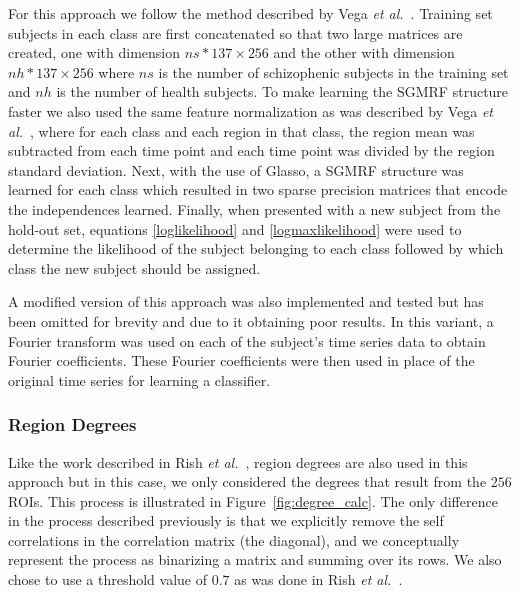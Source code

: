 \documentclass{article} %
\begin{document}
For this approach we follow the method described by Vega \emph{et al.}~\cite{rvega}.
Training set subjects in each class are first concatenated so that two large 
matrices are created, one with dimension $ns * 137 \times 256$ and the other 
with dimension $nh * 137 \times 256$ where $ns$ is the number of schizophenic 
subjects in the training set and $nh$ is the number of health subjects. To
make learning the SGMRF structure faster we also used the same feature 
normalization as was described by Vega \emph{et al.}~\cite{rvega},
where for each class and each region in that class, the region mean was 
subtracted from each time point and each time point was divided by the 
region standard deviation. Next, with the use of Glasso, a SGMRF structure was 
learned for each class which resulted in two sparse precision matrices that 
encode the independences learned. Finally, when presented with a new subject 
from the hold-out set, equations \eqref{loglikelihood} and 
\eqref{logmaxlikelihood} were used to determine the likelihood of the subject 
belonging to each class followed by which class the new subject should be 
assigned.

A modified version of this approach was also implemented and tested but has
been omitted for brevity and due to it obtaining poor results. In this variant,
a Fourier transform was used on each of the subject's time series data to 
obtain Fourier coefficients. These Fourier coefficients were then used in 
place of the original time series for learning a classifier.


\subsubsection{Region Degrees}

Like the work described in Rish \emph{et al.}~\cite{rish2009discriminative}, 
region degrees are also used in this approach but in this case, we only 
considered the degrees that result from the $256$ ROIs. This process is 
illustrated in Figure~\ref{fig:degree_calc}. The only difference in the
process described previously is that we explicitly remove the self 
correlations in the correlation matrix (the diagonal), and we conceptually
represent the process as binarizing a matrix and summing over its rows.
We also chose to use a threshold value of $0.7$ as was done in Rish 
\emph{et al.}~\cite{rish2009discriminative}.
\end{document}
